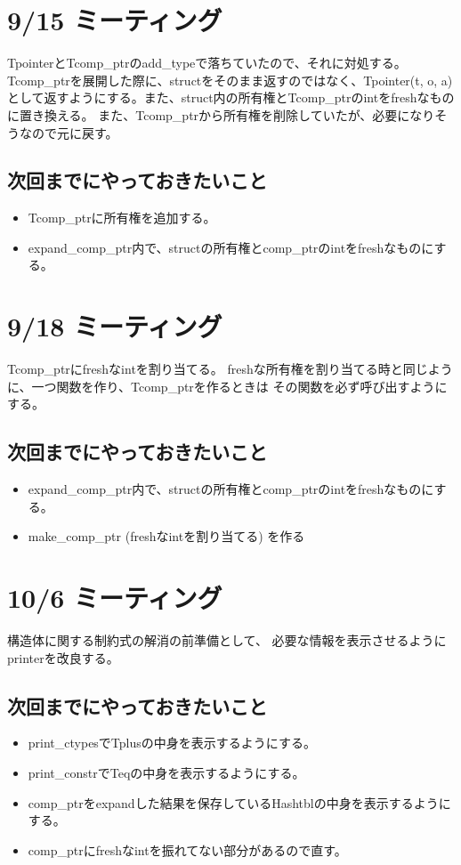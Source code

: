 \documentclass[a4j,proof]{jarticle}
\begin{document}
\section{9/15 ミーティング}
TpointerとTcomp\_ptrのadd\_typeで落ちていたので、それに対処する。
Tcomp\_ptrを展開した際に、structをそのまま返すのではなく、Tpointer(t, o, a)として返すようにする。また、struct内の所有権とTcomp\_ptrのintをfreshなものに置き換える。
また、Tcomp\_ptrから所有権を削除していたが、必要になりそうなので元に戻す。

\subsection{次回までにやっておきたいこと}
\begin{itemize}
  \item Tcomp\_ptrに所有権を追加する。
  \item expand\_comp\_ptr内で、structの所有権とcomp\_ptrのintをfreshなものにする。
\end{itemize}

\section{9/18 ミーティング}
Tcomp\_ptrにfreshなintを割り当てる。
freshな所有権を割り当てる時と同じように、一つ関数を作り、Tcomp\_ptrを作るときは
その関数を必ず呼び出すようにする。

\subsection{次回までにやっておきたいこと}
\begin{itemize}
  \item expand\_comp\_ptr内で、structの所有権とcomp\_ptrのintをfreshなものにする。
  \item make\_comp\_ptr (freshなintを割り当てる) を作る
\end{itemize}

\section{10/6 ミーティング}
構造体に関する制約式の解消の前準備として、
必要な情報を表示させるようにprinterを改良する。

\subsection{次回までにやっておきたいこと}
\begin{itemize}
  \item print\_ctypesでTplusの中身を表示するようにする。
  \item print\_constrでTeqの中身を表示するようにする。
  \item comp\_ptrをexpandした結果を保存しているHashtblの中身を表示するようにする。
  \item comp\_ptrにfreshなintを振れてない部分があるので直す。
\end{itemize}
\end{document}
